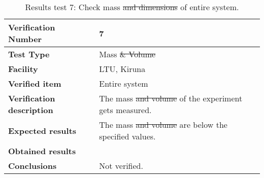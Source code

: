 \begin{table}[H]
\centering

\begin{tabular}{|m{}| m{} |}
\hline
\textbf{Verification Number} 		& 7 				\\ \hline
\textbf{Test Type} 					& Mass \st{\& Volume} 	\\ \hline
\textbf{Facility} 					& LTU, Kiruna 		\\ \hline
\textbf{Verified item} 				& Entire system 	\\ \hline

\textbf{Verification description} 	& The mass \st{and volume} of the experiment gets measured. \\ \hline

\textbf{Expected results} 			& The mass \st{and volume} are below the specified values. \\ \hline

\textbf{Obtained results} 			& \\ \hline

\textbf{Conclusions} 				& Not verified.		\\ \hline
\end{tabular}
\caption{Results test 7: Check mass \st{and dimensions} of entire system.}
\label{tab:testresult7:mass-volume}
\end{table}


\raggedbottom